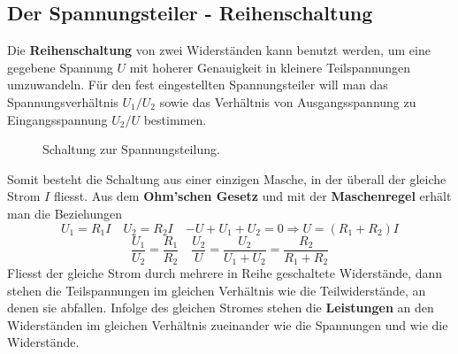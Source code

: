 \subsection{Der Spannungsteiler - Reihenschaltung}
Die \textbf{Reihenschaltung} von zwei Widerständen kann benutzt werden, um eine gegebene Spannung $U$ mit hoherer Genauigkeit in kleinere Teilspannungen umzuwandeln. Für den fest eingestellten Spannungsteiler will man das Spannungsverhältnis $U_1/U_2$ sowie das Verhältnis von Ausgangsspannung zu Eingangsspannung $U_2/U$ bestimmen. 
\begin{figure}[H]
\centering
\caption{Schaltung zur Spannungsteilung.}
\label{fig_IIIm}
\end{figure}
\noindent Somit besteht die Schaltung aus einer einzigen Masche, in der überall der gleiche Strom $I$ fliesst. Aus dem \textbf{Ohm'schen Gesetz} und mit der \textbf{Maschenregel} erhält man die Beziehungen
\begin{equation} 
\boxed{U_1=R_1I}\quad \boxed{U_2=R_2I}\quad \boxed{-U+U_1+U_2=0\Longrightarrow U=\left(R_1+R_2\right)I}
\end{equation} 
\begin{equation}
\boxed{\dfrac{U_1}{U_2}=\dfrac{R_1}{R_2}}\quad \boxed{\dfrac{U_2}{U}=\dfrac{U_2}{U_1+U_2}=\dfrac{R_2}{R_1+R_2}} 
\end{equation} 
Fliesst der gleiche Strom durch mehrere in Reihe geschaltete Widerstände, dann stehen die Teilspannungen im gleichen Verhältnis wie die Teilwiderstände, an denen sie abfallen. 
\newline\newline
Infolge des gleichen Stromes stehen die \textbf{Leistungen} an den Widerständen im gleichen Verhältnis zueinander wie die Spannungen und wie die Widerstände.

